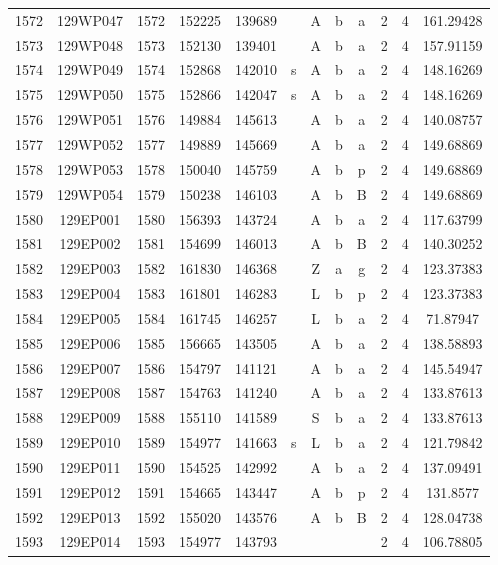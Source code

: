 \begin{tabular}{|*{12}{c|}}
1572 & 129WP047 & 1572 & 152225 & 139689 &  & A & b & a & 2 & 4 & 161.29428 \\ 
1573 & 129WP048 & 1573 & 152130 & 139401 &  & A & b & a & 2 & 4 & 157.91159 \\ 
1574 & 129WP049 & 1574 & 152868 & 142010 & s & A & b & a & 2 & 4 & 148.16269 \\ 
1575 & 129WP050 & 1575 & 152866 & 142047 & s & A & b & a & 2 & 4 & 148.16269 \\ 
1576 & 129WP051 & 1576 & 149884 & 145613 &  & A & b & a & 2 & 4 & 140.08757 \\ 
1577 & 129WP052 & 1577 & 149889 & 145669 &  & A & b & a & 2 & 4 & 149.68869 \\ 
1578 & 129WP053 & 1578 & 150040 & 145759 &  & A & b & p & 2 & 4 & 149.68869 \\ 
1579 & 129WP054 & 1579 & 150238 & 146103 &  & A & b & B & 2 & 4 & 149.68869 \\ 
1580 & 129EP001 & 1580 & 156393 & 143724 &  & A & b & a & 2 & 4 & 117.63799 \\ 
1581 & 129EP002 & 1581 & 154699 & 146013 &  & A & b & B & 2 & 4 & 140.30252 \\ 
1582 & 129EP003 & 1582 & 161830 & 146368 &  & Z & a & g & 2 & 4 & 123.37383 \\ 
1583 & 129EP004 & 1583 & 161801 & 146283 &  & L & b & p & 2 & 4 & 123.37383 \\ 
1584 & 129EP005 & 1584 & 161745 & 146257 &  & L & b & a & 2 & 4 & 71.87947 \\ 
1585 & 129EP006 & 1585 & 156665 & 143505 &  & A & b & a & 2 & 4 & 138.58893 \\ 
1586 & 129EP007 & 1586 & 154797 & 141121 &  & A & b & a & 2 & 4 & 145.54947 \\ 
1587 & 129EP008 & 1587 & 154763 & 141240 &  & A & b & a & 2 & 4 & 133.87613 \\ 
1588 & 129EP009 & 1588 & 155110 & 141589 &  & S & b & a & 2 & 4 & 133.87613 \\ 
1589 & 129EP010 & 1589 & 154977 & 141663 & s & L & b & a & 2 & 4 & 121.79842 \\ 
1590 & 129EP011 & 1590 & 154525 & 142992 &  & A & b & a & 2 & 4 & 137.09491 \\ 
1591 & 129EP012 & 1591 & 154665 & 143447 &  & A & b & p & 2 & 4 & 131.8577 \\ 
1592 & 129EP013 & 1592 & 155020 & 143576 &  & A & b & B & 2 & 4 & 128.04738 \\ 
1593 & 129EP014 & 1593 & 154977 & 143793 &  &  &  &  & 2 & 4 & 106.78805 \\ 

\end{tabular}
